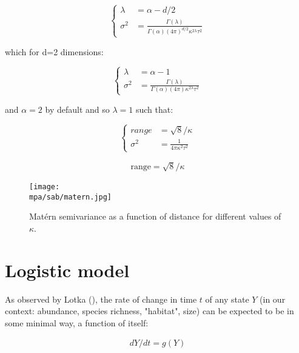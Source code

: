 \documentclass[letterpaper,portrait,11pt]{scrartcl}
\numberwithin{equation}{section}		%
\numberwithin{figure}{section}		%
\numberwithin{table}{section}				%
\newcommand*{\D}{.}
\newcommand{\biodata}{\string~/bio\D data}   %
\newcommand{\mpa}{\biodata/bio\D indicators/mpa}  %
\begin{document}
\begin{appendices}
\begin{equation}
  \begin{cases}
    \lambda  &=  \alpha - d/2 \\
    \sigma^2 &=  \frac{\Gamma(\lambda)}{\Gamma(\alpha)(4\pi)^{d/2}{\kappa}^{2\lambda} \tau^2 }
  \end{cases}
\end{equation}

which for d=2 dimensions:

\begin{equation}
\begin{cases}
\lambda  &=  \alpha - 1 \\
\sigma^2 &=  \frac{\Gamma(\lambda)}{\Gamma(\alpha)(4\pi){\kappa}^{2\lambda} \tau^2 }
\end{cases}
\end{equation}

and $\alpha=2$ by default and so $\lambda=1$ such that:


\begin{equation}
\label{eq:inlaRange}
\begin{cases}
  range    &=  \sqrt{8} / \kappa \\
  \sigma^2 &=  \frac{1}{4 \pi \kappa^2 \tau^2 }
\end{cases}
\end{equation}
 

\begin{eqnarray}
\text{range} = \sqrt{8} / \kappa 
\end{eqnarray} 




\begin{figure}
  \centering
  \texttt{[image: \\mpa/sab/matern.jpg]}
  \caption{Mat\'{e}rn semivariance as a function of distance for different values of $\kappa$.}
  \label{fig:matern}
\end{figure}




\section{Logistic model}
\label{sec:logisticModel}
As observed by Lotka (\citeyear{lotka1925}), the rate of change in time $t$ of any state $Y$ (in our context: abundance, species richness, "habitat", size) can be expected to be in some minimal way, a function of itself:  

\begin{eqnarray} 
\label{eqLogisticContinuous}
dY / dt = g(Y)
\end{eqnarray}


\end{appendices}
\end{document}
